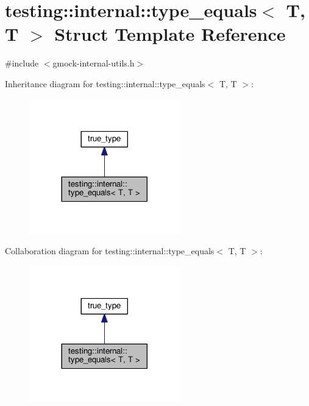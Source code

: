 \hypertarget{structtesting_1_1internal_1_1type__equals_3_01_t_00_01_t_01_4}{}\section{testing\+:\+:internal\+:\+:type\+\_\+equals$<$ T, T $>$ Struct Template Reference}
\label{structtesting_1_1internal_1_1type__equals_3_01_t_00_01_t_01_4}


{\ttfamily \#include $<$gmock-\/internal-\/utils.\+h$>$}



Inheritance diagram for testing\+:\+:internal\+:\+:type\+\_\+equals$<$ T, T $>$\+:
\nopagebreak
\begin{figure}[H]
\begin{center}
\leavevmode
\includegraphics[width=185pt]{structtesting_1_1internal_1_1type__equals_3_01_t_00_01_t_01_4__inherit__graph}
\end{center}
\end{figure}


Collaboration diagram for testing\+:\+:internal\+:\+:type\+\_\+equals$<$ T, T $>$\+:
\nopagebreak
\begin{figure}[H]
\begin{center}
\leavevmode
\includegraphics[width=185pt]{structtesting_1_1internal_1_1type__equals_3_01_t_00_01_t_01_4__coll__graph}
\end{center}
\end{figure}
